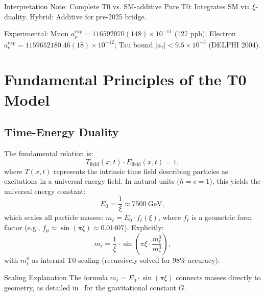 \documentclass[12pt,a4paper]{article}
\theoremstyle{definition}
\begin{document}
	\begin{interpretation}{Interpretation Note: Complete T0 vs. SM-additive}
		Pure T0: Integrates SM via $\xi$-duality. Hybrid: Additive for pre-2025 bridge.
	\end{interpretation}
	
	Experimental: Muon $a_\mu^\text{exp} = 116592070(148) \times 10^{-11}$ (127 ppb); Electron $a_e^\text{exp} = 1159652180.46(18) \times 10^{-12}$; Tau bound $|a_\tau| < 9.5 \times 10^{-3}$ (DELPHI 2004).
	
	\section{Fundamental Principles of the T0 Model}
	\subsection{Time-Energy Duality}
	The fundamental relation is:
	\begin{equation}
		T_{\text{field}}(x,t) \cdot E_{\text{field}}(x,t) = 1,
	\end{equation}
	where $T(x,t)$ represents the intrinsic time field describing particles as excitations in a universal energy field. In natural units ($\hbar = c = 1$), this yields the universal energy constant:
	\begin{equation}
		E_0 = \frac{1}{\xi} \approx \SI{7500}{\giga\electronvolt},
	\end{equation}
	which scales all particle masses: $m_\ell = E_0 \cdot f_\ell(\xi)$, where $f_\ell$ is a geometric form factor (e.g., $f_\mu \approx \sin(\pi \xi) \approx 0.01407$). Explicitly:
	\begin{equation}
		m_\ell = \frac{1}{\xi} \cdot \sin\left(\pi \xi \cdot \frac{m_\ell^0}{m_e^0}\right),
	\end{equation}
	with $m_\ell^0$ as internal T0 scaling (recursively solved for 98\% accuracy).
	
	\begin{explanation}{Scaling Explanation}
		The formula $m_\ell = E_0 \cdot \sin(\pi \xi)$ connects masses directly to geometry, as detailed in~\cite{T0_gravitational_constant} for the gravitational constant $G$.
	\end{explanation}
	
\end{document}
